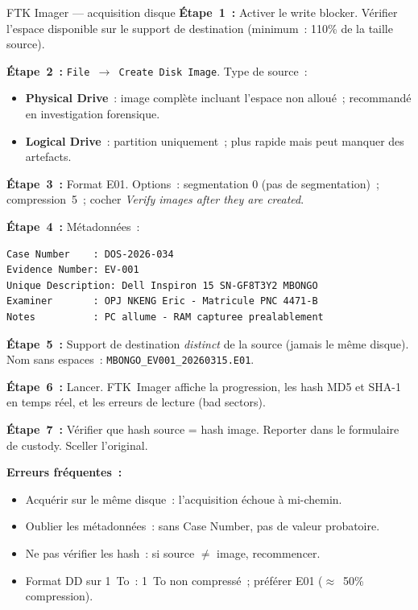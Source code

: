 \begin{boxoutils}{FTK Imager --- acquisition disque}
\textbf{Étape~1~:} Activer le write blocker. Vérifier l'espace disponible
sur le support de destination (minimum~: 110\% de la taille source).

\textbf{Étape~2~:} \texttt{File~$\to$ Create Disk Image}. Type de source~:
\begin{itemize}
    \item \textbf{Physical Drive}~: image complète incluant l'espace
          non alloué~; recommandé en investigation forensique.
    \item \textbf{Logical Drive}~: partition uniquement~; plus rapide
          mais peut manquer des artefacts.
\end{itemize}

\textbf{Étape~3~:} Format E01. Options~: segmentation 0 (pas de segmentation)~;
compression~5~; cocher \textit{Verify images after they are created}.

\textbf{Étape~4~:} Métadonnées~:
\begin{lstlisting}[language=bash_forensique]
Case Number    : DOS-2026-034
Evidence Number: EV-001
Unique Description: Dell Inspiron 15 SN-GF8T3Y2 MBONGO
Examiner       : OPJ NKENG Eric - Matricule PNC 4471-B
Notes          : PC allume - RAM capturee prealablement
\end{lstlisting}

\textbf{Étape~5~:} Support de destination \emph{distinct} de la source
(jamais le même disque). Nom sans espaces~:
\texttt{MBONGO\_EV001\_20260315.E01}.

\textbf{Étape~6~:} Lancer. FTK~Imager affiche la progression, les hash
MD5 et SHA-1 en temps réel, et les erreurs de lecture (bad sectors).

\textbf{Étape~7~:} Vérifier que hash source = hash image. Reporter dans
le formulaire de custody. Sceller l'original.
\end{boxoutils}

\begin{boxalert}
\textbf{Erreurs fréquentes~:}
\begin{itemize}
    \item Acquérir sur le même disque~: l'acquisition échoue à mi-chemin.
    \item Oublier les métadonnées~: sans Case Number, pas de valeur probatoire.
    \item Ne pas vérifier les hash~: si source $\neq$ image, recommencer.
    \item Format DD sur 1~To~: 1~To non compressé~; préférer E01
          ($\approx$~50\% compression).
\end{itemize}
\end{boxalert}


